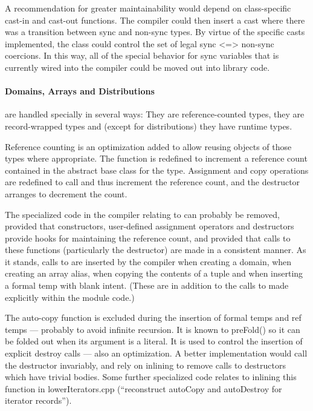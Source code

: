 A recommendation for greater maintainability would depend on class-specific
cast-in and cast-out functions.  The compiler could then insert a cast where
there was a transition between sync and non-sync types.  By virtue of the
specific casts implemented, the class could control the set of legal sync <=>
non-sync coercions.  In this way, all of the special behavior for sync variables
that is currently wired into the compiler could be moved out into library code.

\paragraph{Domains, Arrays and Distributions}
are handled specially in several ways: They
are reference-counted types, they are record-wrapped types and (except for
distributions) they have runtime types.

Reference counting is an optimization added to allow reusing objects of those
types where appropriate.  The function  is redefined to
increment a reference count contained in the abstract base class for the type.
Assignment and copy operations are redefined to call  and
thus increment the reference count, and the destructor arranges to decrement the
count.

The specialized code in the compiler relating to  can probably be
removed, provided that constructors, user-defined assignment operators and destructors
provide hooks for maintaining the reference count, and provided that calls to
these functions (particularly the destructor) are made in a consistent manner.
As it stands, calls to  are inserted by the compiler when
creating a domain, when creating an array alias, when copying the contents of a
tuple and when inserting a formal temp with blank intent.  (These are in
addition to the calls to  made explicitly within the module
code.)

The auto-copy function is excluded during the insertion of formal temps and ref
temps --- probably to avoid infinite recursion.  It is known to preFold() so it
can be folded out when its argument is a literal.  It is
used to control the insertion of explicit destroy calls --- also an
optimization.  A better implementation would call the destructor invariably,
and rely on inlining to remove calls to destructors which have trivial bodies.
Some further specialized code relates to inlining this function in lowerIterators.cpp
(``reconstruct autoCopy and autoDestroy for iterator records'').

